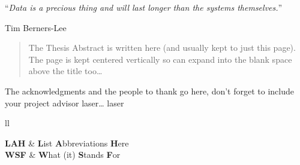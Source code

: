 \documentclass[
11pt, %
english, %
doublespacing, %
nolistspacing, %
parskip, %
headsepline, %
the default layout
]{MastersDoctoralThesis} %
\begin{document}
\vspace*{0.2\textheight}

\noindent\enquote{\itshape Data is a precious thing and will last longer than the systems themselves.}\bigbreak

\hfill  Tim Berners-Lee

\begin{abstract}
\addchaptertocentry{\abstractname} %
The Thesis Abstract is written here (and usually kept to just this page). The page is kept centered vertically so can expand into the blank space above the title too\ldots
\end{abstract}


\begin{acknowledgements}
\addchaptertocentry{\acknowledgementname} %
The acknowledgments and the people to thank go here, don't forget to include your project advisor \gls{laser}\ldots
\gls{laser}
\end{acknowledgements}


\begingroup
\hypersetup{linkcolor=refC}
\renewcommand{\baselinestretch}{1.1}\normalsize
\tableofcontents %
\renewcommand{\baselinestretch}{1.5}\normalsize

\printglossaries

\listoffigures %

\listoftables %




\begin{abbreviations}{ll} %

\textbf{LAH} & \textbf{L}ist \textbf{A}bbreviations \textbf{H}ere\\
\textbf{WSF} & \textbf{W}hat (it) \textbf{S}tands \textbf{F}or\\

\end{abbreviations}
\end{document}
